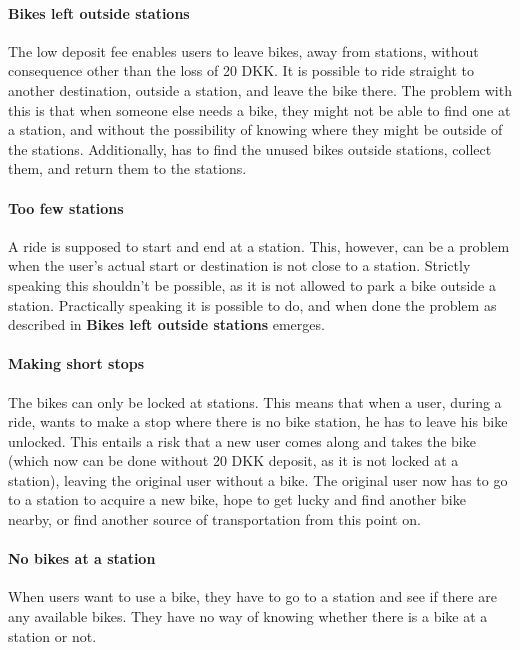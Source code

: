 \paragraph{Bikes left outside stations}
The low deposit fee enables users to leave bikes, away from stations, without consequence other than the loss of 20 DKK.
It is possible to ride straight to another destination, outside a station, and leave the bike there.
The problem with this is that when someone else needs a bike, they might not be able to find one at a station, and without the possibility of knowing where they might be outside of the stations.
Additionally, \citybike has to find the unused bikes outside stations, collect them, and return them to the stations.

\paragraph{Too few stations}
A ride is supposed to start and end at a station.
This, however, can be a problem when the user's actual start or destination is not close to a station.
Strictly speaking this shouldn't be possible, as it is not allowed to park a bike outside a station.
Practically speaking it is possible to do, and when done the problem as described in \textbf{Bikes left outside stations} emerges.

\paragraph{Making short stops}
The bikes can only be locked at stations.
This means that when a user, during a ride, wants to make a stop where there is no bike station, he has to leave his bike unlocked.
This entails a risk that a new user comes along and takes the bike (which now can be done without 20 DKK deposit, as it is not locked at a station), leaving the original user without a bike.
The original user now has to go to a station to acquire a new bike, hope to get lucky and find another bike nearby, or find another source of transportation from this point on.

\paragraph{No bikes at a station}
When users want to use a bike, they have to go to a station and see if there are any available bikes.
They have no way of knowing whether there is a bike at a station or not.

